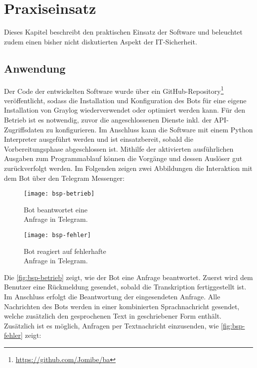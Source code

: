 \chapter{Praxiseinsatz}
\label{cha:praxiseinsatz}

Dieses Kapitel beschreibt den praktischen Einsatz der Software und beleuchtet zudem einen bisher nicht diskutierten Aspekt der IT-Sicherheit.

\section{Anwendung}

Der Code der entwickelten Software wurde über ein GitHub-Repository\footnote{\url{https://github.com/Jomibe/ba}} veröffentlicht, sodass die Installation und Konfiguration des Bots für eine eigene Installation von Graylog wiederverwendet oder optimiert werden kann. Für den Betrieb ist es notwendig, zuvor die angeschlossenen Dienste inkl. der API-Zugriffsdaten zu konfigurieren. Im Anschluss kann die Software mit einem Python Interpreter ausgeführt werden und ist einsatzbereit, sobald die Vorbereitungsphase abgeschlossen ist. Mithilfe der aktivierten ausführlichen Ausgaben zum Programmablauf können die Vorgänge und dessen Auslöser gut zurückverfolgt werden. Im Folgenden zeigen zwei Abbildungen die Interaktion mit dem Bot über den Telegram Messenger:

\begin{figure}[h!]
    \centering
    \begin{minipage}{0.5\textwidth}
        \raggedright
        \texttt{[image: bsp-betrieb]}
        \caption{Bot beantwortet eine \\\hspace{\textwidth}Anfrage in Telegram.}
        \label{fig:bsp-betrieb}
    \end{minipage}\hfill
    \begin{minipage}{0.5\textwidth}
        \raggedleft
        \texttt{[image: bsp-fehler]}
        \caption{Bot reagiert auf fehlerhafte \\\hspace{\textwidth}Anfrage in Telegram.}
        \label{fig:bsp-fehler}
    \end{minipage}
\end{figure}

Die \autoref{fig:bsp-betrieb} zeigt, wie der Bot eine Anfrage beantwortet. Zuerst wird dem Benutzer eine Rückmeldung gesendet, sobald die Transkription fertiggestellt ist. Im Anschluss erfolgt die Beantwortung der eingesendeten Anfrage. Alle Nachrichten des Bots werden in einer kombinierten Sprachnachricht gesendet, welche zusätzlich den gesprochenen Text in geschriebener Form enthält. Zusätzlich ist es möglich, Anfragen per Textnachricht einzusenden, wie \autoref{fig:bsp-fehler} zeigt:

